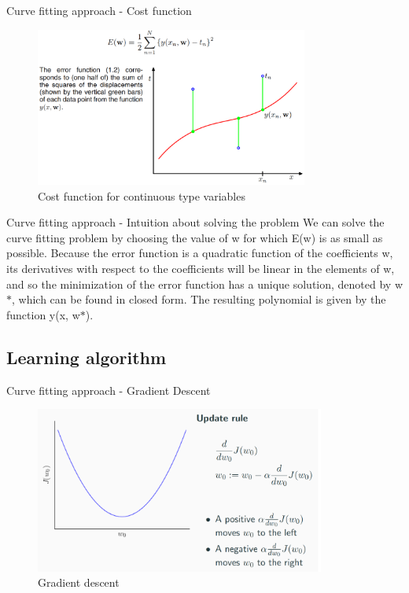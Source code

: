 \documentclass{beamer}
\begin{document}
\begin{frame}{Curve fitting approach - Cost function}
\begin{figure}
  \centering
    \includegraphics[width=0.80\textwidth]{plot_cost}
  		\caption{ Cost function for continuous type variables }
    \label{plot_cost_function}
 \end{figure}
\end{frame}

\begin{frame}{Curve fitting approach - Intuition about solving the problem}
We can solve the curve fitting problem by choosing the value of w for which
E(w) is as small as possible. Because the error function is a quadratic function of
the coefficients w, its derivatives with respect to the coefficients will be linear in the
elements of w, and so the minimization of the error function has a unique solution,
denoted by w$*$, which can be found in closed form. The resulting polynomial is
given by the function y(x, w$*$).
\end{frame}

\subsection{Learning algorithm}
\begin{frame}{Curve fitting approach - Gradient Descent}
\begin{figure}
  \centering
    \includegraphics[width=0.85\textwidth]{updaterule}
  		\caption{ Gradient descent }
    \label{updaterule}
 \end{figure}
\end{frame}
\end{document}
